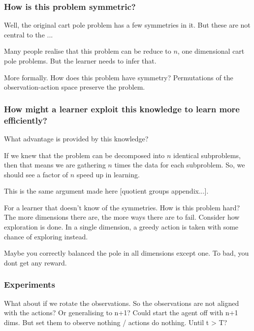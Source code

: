 
\subsubsection{How is this problem symmetric?}

Well, the original cart pole problem has a few symmetries in it. But these are
not central to the ...

Many people realise that this problem can be reduce to $n$, one dimensional cart pole problems.
But the learner needs to infer that.

More formally. How does this problem have symmetry?
Permutations of the observation-action space preserve the problem.

\subsubsection{How might a learner exploit this knowledge to learn more efficiently?}

What advantage is provided by this knowledge?

If we knew that the problem can be decomposed into $n$ identical subproblems,
then that means we are gathering $n$ times the data for each subproblem.
So, we should see a factor of $n$ speed up in learning.

This is the same argument made here [quotient groups appendix...].

For a learner that doesn't know of the symmetries. How is this problem hard?
The more dimensions there are, the more ways there are to fail.
Consider how exploration is done. In a single dimension, a greedy action is
taken with some chance of exploring instead.

Maybe you correctly balanced the pole in all dimensions except one. To bad, you dont get any reward.



\subsubsection{Experiments}

What about if we rotate the observations. So the observations are not aligned with the actions?
Or generalising to n+1? Could start the agent off with n+1 dims. But set them to observe nothing / actions do nothing. Until t > T?


